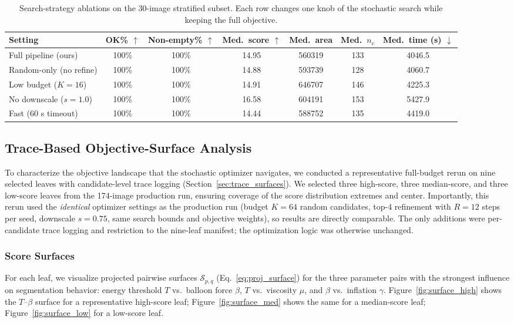 \documentclass[journal]{IEEEtran}
\begin{document}
\begin{table}[t]
\centering
\caption{Search-strategy ablations on the 30-image stratified subset. Each row changes one knob of the stochastic search while keeping the full objective.}
\label{tab:abl_search}
\begin{tabular}{lcccccc}
\toprule
Setting & OK\% $\uparrow$ & Non-empty\% $\uparrow$ & Med.\ score $\uparrow$ & Med.\ area & Med.\ $n_c$ & Med.\ time (s) $\downarrow$ \\
\midrule
Full pipeline (ours) & 100\% & 100\% & 14.95 & 560319 & 133 & 4046.5 \\
Random-only (no refine) & 100\% & 100\% & 14.88 & 593739 & 128 & 4060.7 \\
Low budget ($K{=}16$) & 100\% & 100\% & 14.91 & 646707 & 146 & 4225.3 \\
No downscale ($s{=}1.0$) & 100\% & 100\% & 16.58 & 604191 & 153 & 5427.9 \\
Fast (60 s timeout) & 100\% & 100\% & 14.44 & 588752 & 135 & 4419.0 \\
\bottomrule
\end{tabular}
\end{table}

\subsection{Trace-Based Objective-Surface Analysis}
\label{sec:trace_analysis}
To characterize the objective landscape that the stochastic optimizer navigates, we conducted a representative full-budget rerun on nine selected leaves with candidate-level trace logging (Section~\ref{sec:trace_surfaces}). We selected three high-score, three median-score, and three low-score leaves from the 174-image production run, ensuring coverage of the score distribution extremes and center. Importantly, this rerun used the \emph{identical} optimizer settings as the production run (budget $K{=}64$ random candidates, top-$4$ refinement with $R{=}12$ steps per seed, downscale $s{=}0.75$, same search bounds and objective weights), so results are directly comparable. The only additions were per-candidate trace logging and restriction to the nine-leaf manifest; the optimization logic was otherwise unchanged.

\subsubsection{Score Surfaces}
For each leaf, we visualize projected pairwise surfaces $\mathcal{S}_{p,q}$ (Eq.~\ref{eq:proj_surface}) for the three parameter pairs with the strongest influence on segmentation behavior: energy threshold $T$ vs.\ balloon force $\beta$, $T$ vs.\ viscosity $\mu$, and $\beta$ vs.\ inflation $\gamma$. Figure~\ref{fig:surface_high} shows the $T$--$\beta$ surface for a representative high-score leaf; Figure~\ref{fig:surface_med} shows the same for a median-score leaf; Figure~\ref{fig:surface_low} for a low-score leaf.
\end{document}
